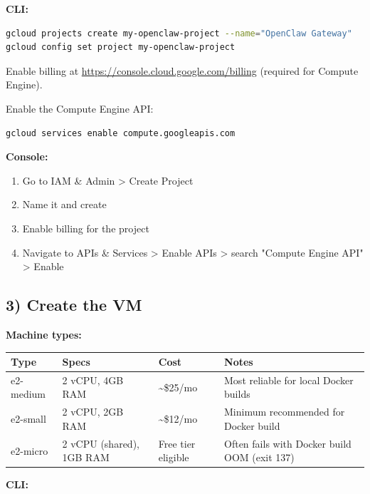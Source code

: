 \textbf{CLI:}

\begin{lstlisting}[language=bash]
gcloud projects create my-openclaw-project --name="OpenClaw Gateway"
gcloud config set project my-openclaw-project
\end{lstlisting}


Enable billing at \href{https://console.cloud.google.com/billing}{https://console.cloud.google.com/billing} (required for Compute Engine).

Enable the Compute Engine API:

\begin{lstlisting}[language=bash]
gcloud services enable compute.googleapis.com
\end{lstlisting}


\textbf{Console:}

\begin{enumerate}
  \item Go to IAM \& Admin > Create Project
  \item Name it and create
  \item Enable billing for the project
  \item Navigate to APIs \& Services > Enable APIs > search "Compute Engine API" > Enable
\end{enumerate}


\hrulefill


\subsection{3) Create the VM}


\textbf{Machine types:}


\begin{table}[h]
\centering
\small
\begin{tabular}{|l|l|l|l|}
\hline
Type & Specs & Cost & Notes \\
\hline
e2-medium & 2 vCPU, 4GB RAM & \textasciitilde{}\$25/mo & Most reliable for local Docker builds \\
\hline
e2-small & 2 vCPU, 2GB RAM & \textasciitilde{}\$12/mo & Minimum recommended for Docker build \\
\hline
e2-micro & 2 vCPU (shared), 1GB RAM & Free tier eligible & Often fails with Docker build OOM (exit 137) \\
\hline
\end{tabular}
\end{table}



\textbf{CLI:}

